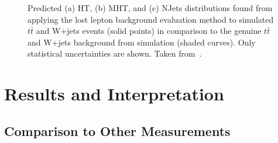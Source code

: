 \begin{figure}[!h]
  \centering
{}
  \caption{Predicted (a) HT, (b) MHT, and (c) NJets distributions found from applying the lost lepton background evaluation method to simulated $t\bar{t}$ and W+jets events (solid points) in comparison to the genuine $t\bar{t}$ and W+jets background from simulation (shaded curves). Only statistical uncertainties are shown. Taken from~\cite{Chatrchyan:2014lfa}.}
  \label{fig:ra2_ll}
\end{figure}

\section{Results and Interpretation}
\label{sec:RA2_results}

\subsection{Comparison to Other Measurements}
\label{subsec:RA2_comp}

